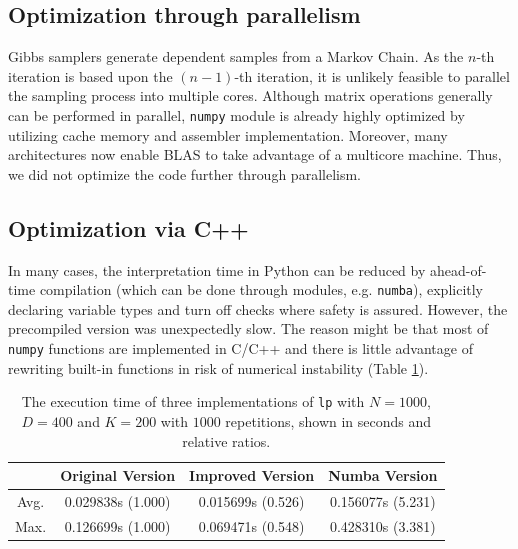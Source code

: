 \documentclass{article}
\begin{document}
\subsection{Optimization through parallelism}

Gibbs samplers generate dependent samples from a Markov Chain. As the $n$-th iteration is based upon the $(n-1)$-th iteration, it is unlikely feasible to parallel the sampling process into multiple cores. Although matrix operations generally can be performed in parallel, \texttt{numpy} module is already highly optimized by utilizing cache memory and assembler implementation. Moreover, many architectures now enable BLAS to take advantage of a multicore machine. Thus, we did not optimize the code further through parallelism.
\subsection{Optimization via C++}
 In many cases, the interpretation time in Python can be reduced by ahead-of-time compilation (which can be done through modules, e.g. \texttt{numba}\citep{numba10.1145/2833157.2833162}), explicitly declaring variable types and turn off checks where safety is assured. However, the precompiled version was unexpectedly slow. The reason might be that most of \texttt{numpy} functions are implemented in C/C++ and there is little advantage of rewriting built-in functions in risk of numerical instability (Table \ref{tbl::numba}). 

 \begin{table}[!h]
  \centering
  \small
  \caption{The execution time of three implementations of \texttt{lp} with $N = 1000$, $D = 400$ and $K = 200$ with $1000$ repetitions, shown in seconds and relative ratios.}
  \label{tbl::numba}
  \begin{tabular}{cccc}
    \toprule
    & Original Version & Improved Version & Numba Version \\
    \midrule
    Avg. & 0.029838s (1.000) & 0.015699s (0.526) & 0.156077s (5.231) \\
    Max. & 0.126699s (1.000) & 0.069471s (0.548) & 0.428310s (3.381) \\
    \bottomrule
  \end{tabular}
\end{table}
\end{document}
